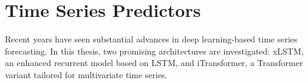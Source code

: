 \documentclass[class=scrbook, crop=false]{standalone}
\begin{document}
 






\section{Time Series Predictors}
\label{Section::Time_Series_Predictors}
Recent years have seen substantial advances in deep learning-based time series forecasting. In this thesis, two promising architectures are investigated: xLSTM, an enhanced recurrent model based on LSTM, and iTransformer, a Transformer variant tailored for multivariate time series.
\end{document}
